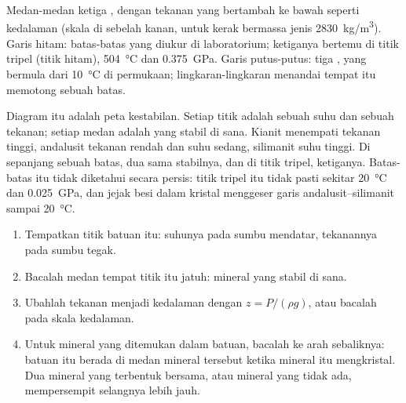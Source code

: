 \begin{omfigure}
{\small Medan-medan ketiga  , dengan tekanan yang bertambah
ke bawah seperti kedalaman (skala di sebelah kanan, untuk kerak bermassa jenis
\qty{2830}{kg/m^3}). Garis hitam: batas-batas yang diukur di laboratorium;
ketiganya bertemu di titik tripel (titik hitam), \qty{504}{\celsius} dan
\qty{0.375}{GPa}. Garis putus-putus: tiga , yang bermula dari
\qty{10}{\celsius} di permukaan; lingkaran-lingkaran menandai tempat 
itu memotong sebuah batas.}
\end{omfigure}

Diagram itu adalah peta kestabilan. Setiap titik adalah sebuah suhu dan sebuah
tekanan; setiap medan adalah  yang stabil di sana. Kianit menempati
tekanan tinggi, andalusit tekanan rendah dan suhu sedang, silimanit suhu
tinggi. Di sepanjang sebuah batas, dua  sama stabilnya, dan di titik
tripel, ketiganya. Batas-batas itu tidak diketahui secara persis: titik tripel
itu tidak pasti sekitar \qty{20}{\celsius} dan \qty{0.025}{GPa}, dan jejak besi
dalam kristal menggeser garis andalusit--silimanit sampai \qty{20}{\celsius}.

\begin{method}\label{met:g12:metamorphic-rocks:pt}
\begin{enumerate}
  \item Tempatkan titik batuan itu: suhunya pada sumbu mendatar, tekanannya
        pada sumbu tegak.
  \item Bacalah medan tempat titik itu jatuh: mineral yang stabil di sana.
  \item Ubahlah tekanan menjadi kedalaman dengan $z = P/(\rho g)$, atau
        bacalah pada skala kedalaman.
  \item Untuk mineral yang ditemukan dalam batuan, bacalah ke arah sebaliknya:
        batuan itu berada di medan mineral tersebut ketika mineral itu
        mengkristal. Dua mineral yang terbentuk bersama, atau mineral yang
        tidak ada, mempersempit selangnya lebih jauh.
\end{enumerate}
\end{method}

